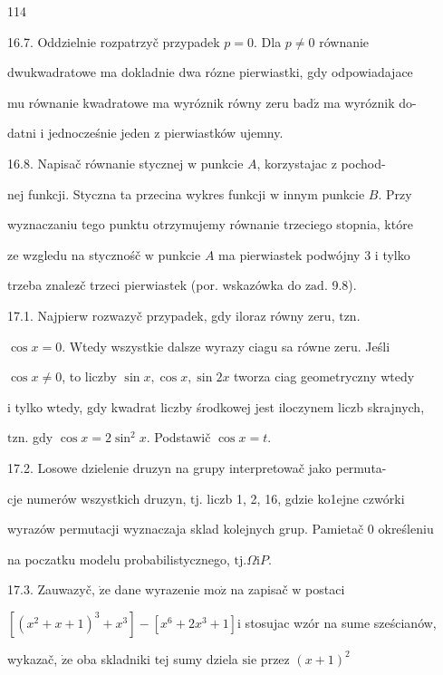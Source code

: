 \documentclass[a4paper,12pt]{article}
\begin{document}
114

16.7. Oddzielnie rozpatrzyč przypadek $p = 0$. Dla $p \neq 0$ równanie

dwukwadratowe ma dokladnie dwa rózne pierwiastki, gdy odpowiadajace

mu równanie kwadratowe ma wyróznik równy zeru $\mathrm{b}\mathrm{a}\mathrm{d}\acute{\mathrm{z}}$ ma wyróznik do-

datni $\mathrm{i}$ jednocześnie jeden $\mathrm{z}$ pierwiastków ujemny.

16.8. Napisač równanie stycznej $\mathrm{w}$ punkcie $A$, korzystajac $\mathrm{z}$ pochod-

nej funkcji. Styczna ta przecina wykres funkcji $\mathrm{w}$ innym punkcie $B$. Przy

wyznaczaniu tego punktu otrzymujemy równanie trzeciego stopnia, które

ze wzgledu na stycznośč $\mathrm{w}$ punkcie $A$ ma pierwiastek podwójny 3 $\mathrm{i}$ tylko

trzeba znalez$\acute{}$č trzeci pierwiastek (por. wskazówka do $\mathrm{z}\mathrm{a}\mathrm{d}$. 9.8).

17.1. Najpierw rozwazyč przypadek, gdy iloraz równy zeru, $\mathrm{t}\mathrm{z}\mathrm{n}.$

$\cos x = 0$. Wtedy wszystkie dalsze wyrazy ciagu sa równe zeru. Jeśli

$\cos x \neq 0$, to liczby $\sin x, \cos x, \sin 2x$ tworza ciag geometryczny wtedy

$\mathrm{i}$ tylko wtedy, gdy kwadrat liczby środkowej jest iloczynem liczb skrajnych,

$\mathrm{t}\mathrm{z}\mathrm{n}$. gdy $\cos x=2\sin^{2}x$. Podstawič $\cos x=t.$

17.2. Losowe dzielenie druzyn na grupy interpretowač jako permuta-

cje numerów wszystkich druzyn, $\mathrm{t}\mathrm{j}$. liczb 1, 2, 16, gdzie ko1ejne czwórki

wyrazów permutacji wyznaczaja sklad kolejnych grup. Pamietač $0$ określeniu

na poczatku modelu probabilistycznego, $\mathrm{t}\mathrm{j}. \Omega \mathrm{i}P.$

17.3. Zauwazyč, $\dot{\mathrm{z}}\mathrm{e}$ dane wyrazenie $\mathrm{m}\mathrm{o}\dot{\mathrm{z}}$ na zapisač $\mathrm{w}$ postaci

$[(x^{2}+x+1)^{3}+x^{3}] - [x^{6}+2x^{3}+1] \mathrm{i}$ stosujac wzór na sume sześcianów,

wykazač, $\dot{\mathrm{z}}\mathrm{e}$ oba skladniki tej sumy dziela $\mathrm{s}\mathrm{i}\mathrm{e}$ przez $(x+1)^{2}$
\end{document}
